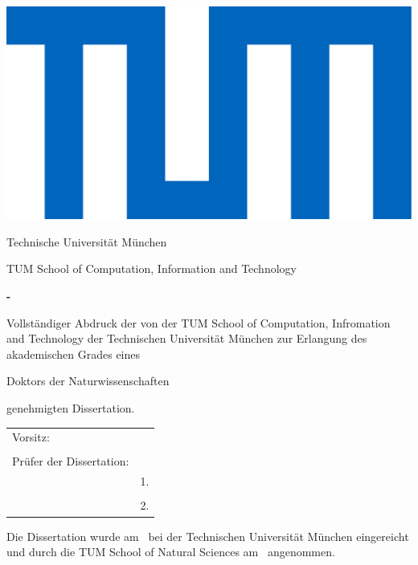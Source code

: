 \thispagestyle{empty}
\hfill
\includegraphics[height=0.1\textwidth]{assets/logo_tum.pdf}
\vspace*{0.5cm}

\begin{center}
	{\Large Technische Universit\"at M\"unchen}
\end{center}
\vspace*{0.5cm}

\begin{center}
	{\Large TUM School of Computation, Information and Technology}
\end{center}
\vspace*{0.5cm}


\begin{center}
	{
		\LARGE\textbf{\getTitle - }\par
		\vspace{0.3cm}
		\large \textbf{\getSubTitle}\par
	}
\end{center}
\vspace*{0.5cm}

\begin{center}
	{\Large \textbf{\getAuthor}}
\end{center}
\vspace*{1.0cm}

\vfill
{\setlength{\parindent}{0cm} Vollst\"andiger Abdruck der von der TUM School of Computation, Infromation and Technology der Technischen Universit\"at M\"unchen zur Erlangung des akademischen Grades eines}
\begin{center}
	{Doktors der Naturwissenschaften}
\end{center}
{genehmigten Dissertation.}
\vspace*{1cm}
\begin{table}[h]
	\centering
	\begin{tabular}{ll}
		{Vorsitz:}  & {\;\;\; \getChairman} \\
		& \\
		{Pr\"ufer der Dissertation:} & \\
		& {1. \getSupervisor} \\
		& \\	
		& {2. \getExaminer} \\
	\end{tabular}
\end{table}
\vspace*{1cm}

{\setlength{\parindent}{0cm} Die Dissertation wurde am \getSubmissionDate\ bei
	der Technischen Universit\"at M\"unchen eingereicht und durch die
	TUM School of Natural Sciences
	am \getAcceptanceDate\ angenommen.}

\pagestyle{empty}